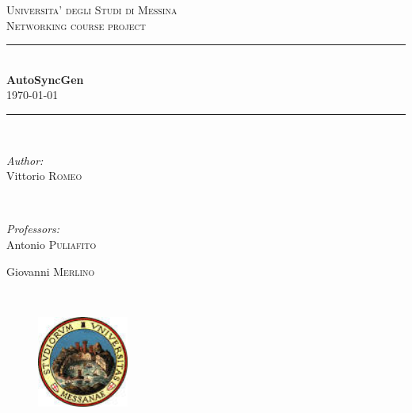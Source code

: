 \documentclass{report}
\newcommand{\HRule}{\rule{\linewidth}{0.5mm}}
\begin{document}
    \begin{titlepage}

        \center

        \textsc{\LARGE Universita' degli Studi di Messina}\\[1.5cm] 
        \textsc{\Large Networking course project}\\[0.5cm] 

        \HRule \\[0.4cm]
        { \huge \bfseries AutoSyncGen}\\[0.1cm]

        {\large \today}
        \HRule \\[1.5cm]
         
        \begin{minipage}{0.4\textwidth}
        \begin{flushleft} \large
        \emph{Author:}\\
        Vittorio \textsc{Romeo} %
        \end{flushleft}
        \end{minipage}
        ~
        \begin{minipage}{0.4\textwidth}
        \begin{flushright} \large
        \emph{Professors:} \\
        Antonio \textsc{Puliafito}

        Giovanni \textsc{Merlino}
        \end{flushright}
        \end{minipage}\\[4cm]

        \vfill

        \begin{minipage}{\linewidth}
            \centering
            \begin{minipage}{0.35\linewidth}
                \begin{figure}[H]
                    \center
                    \includegraphics[width=3cm, height=3cm]{logounime}
                    

\end{figure}
\end{minipage}
\end{minipage}
\end{titlepage}
\end{document}
